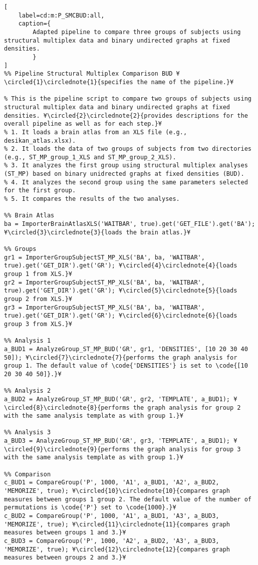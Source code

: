 \documentclass{tufte-handout}
\begin{document}
\begin{lstlisting}[
	label=cd:m:P_SMCBUD:all,
	caption={
		Adapted pipeline to compare three groups of subjects using structural multiplex data and binary undirected graphs at fixed densities.
		}
]
%% Pipeline Structural Multiplex Comparison BUD ¥\circled{1}\circlednote{1}{specifies the name of the pipeline.}¥

% This is the pipeline script to compare two groups of subjects using structural multiplex data and binary undirected graphs at fixed densities. ¥\circled{2}\circlednote{2}{provides descriptions for the overall pipeline as well as for each step.}¥
% 1. It loads a brain atlas from an XLS file (e.g., desikan_atlas.xlsx).
% 2. It loads the data of two groups of subjects from two directories (e.g., ST_MP_group_1_XLS and ST_MP_group_2_XLS).
% 3. It analyzes the first group using structural multiplex analyses (ST_MP) based on binary unidrected graphs at fixed densities (BUD).
% 4. It analyzes the second group using the same parameters selected for the first group.
% 5. It compares the results of the two analyses.

%% Brain Atlas
ba = ImporterBrainAtlasXLS('WAITBAR', true).get('GET_FILE').get('BA'); ¥\circled{3}\circlednote{3}{loads the brain atlas.}¥

%% Groups
gr1 = ImporterGroupSubjectST_MP_XLS('BA', ba, 'WAITBAR', true).get('GET_DIR').get('GR'); ¥\circled{4}\circlednote{4}{loads group 1 from XLS.}¥
gr2 = ImporterGroupSubjectST_MP_XLS('BA', ba, 'WAITBAR', true).get('GET_DIR').get('GR'); ¥\circled{5}\circlednote{5}{loads group 2 from XLS.}¥
gr3 = ImporterGroupSubjectST_MP_XLS('BA', ba, 'WAITBAR', true).get('GET_DIR').get('GR'); ¥\circled{6}\circlednote{6}{loads group 3 from XLS.}¥

%% Analysis 1
a_BUD1 = AnalyzeGroup_ST_MP_BUD('GR', gr1, 'DENSITIES', [10 20 30 40 50]); ¥\circled{7}\circlednote{7}{performs the graph analysis for group 1. The default value of \code{'DENSITIES'} is set to \code{[10 20 30 40 50]}.}¥

%% Analysis 2
a_BUD2 = AnalyzeGroup_ST_MP_BUD('GR', gr2, 'TEMPLATE', a_BUD1); ¥\circled{8}\circlednote{8}{performs the graph analysis for group 2 with the same analysis template as with group 1.}¥

%% Analysis 3
a_BUD3 = AnalyzeGroup_ST_MP_BUD('GR', gr3, 'TEMPLATE', a_BUD1); ¥\circled{9}\circlednote{9}{performs the graph analysis for group 3 with the same analysis template as with group 1.}¥

%% Comparison
c_BUD1 = CompareGroup('P', 1000, 'A1', a_BUD1, 'A2', a_BUD2, 'MEMORIZE', true); ¥\circled{10}\circlednote{10}{compares graph measures between groups 1 group 2. The default value of the number of permutations is \code{'P'} set to \code{1000}.}¥
c_BUD2 = CompareGroup('P', 1000, 'A1', a_BUD1, 'A3', a_BUD3, 'MEMORIZE', true); ¥\circled{11}\circlednote{11}{compares graph measures between groups 1 and 3.}¥
c_BUD3 = CompareGroup('P', 1000, 'A2', a_BUD2, 'A3', a_BUD3, 'MEMORIZE', true); ¥\circled{12}\circlednote{12}{compares graph measures between groups 2 and 3.}¥
\end{lstlisting}
\end{document}
